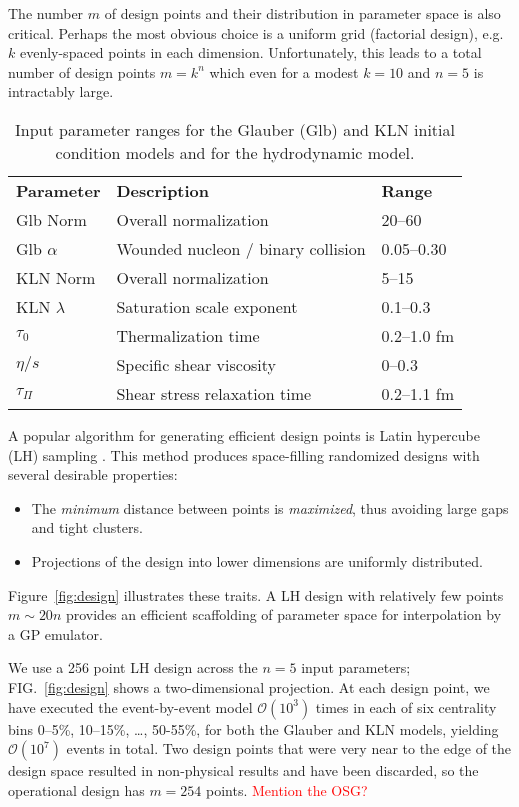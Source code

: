\documentclass[aps,prc,reprint,superscriptaddress,amsmath]{revtex4-1}
\newcommand{\todo}[1]{\textcolor{red}{#1}}
\begin{document}
The number $m$ of design points and their distribution in parameter space is also critical.
Perhaps the most obvious choice is a uniform grid (factorial design), e.g.\ $k$ evenly-spaced points in each dimension.
Unfortunately, this leads to a total number of design points $m = k^n$ which even for a modest $k = 10$ and $n = 5$ is intractably large.

\begin{table}[b]
  \caption{
    \label{tab:design}
    Input parameter ranges for the Glauber (Glb) and KLN initial condition models and for the hydrodynamic model.
  }
  \begin{ruledtabular}
  \begin{tabular}{lll}
    \bf Parameter & \bf Description & \bf Range \\
    Glb Norm & Overall normalization & 20--60 \\
    Glb $\alpha$ & Wounded nucleon / binary collision & 0.05--0.30 \\
    KLN Norm & Overall normalization & 5--15 \\
    KLN $\lambda$ & Saturation scale exponent & 0.1--0.3 \\
    $\tau_0$ & Thermalization time & 0.2--1.0 fm \\
    $\eta/s$ & Specific shear viscosity & 0--0.3 \\
    $\tau_\Pi$ & Shear stress relaxation time & 0.2--1.1 fm \\
  \end{tabular}
  \end{ruledtabular}
\end{table}

A popular algorithm for generating efficient design points is Latin hypercube (LH) sampling \cite{Tang:1993lh}.
This method produces space-filling randomized designs with several desirable properties:
\begin{itemize}
  \item The \emph{minimum} distance between points is \emph{maximized}, thus avoiding large gaps and tight clusters.
  \item Projections of the design into lower dimensions are uniformly distributed.
\end{itemize}
Figure~\ref{fig:design} illustrates these traits.
A LH design with relatively few points $m \sim 20n$ provides an efficient scaffolding of parameter space for interpolation by a GP emulator.

We use a 256 point LH design across the $n = 5$ input parameters; FIG.~\ref{fig:design} shows a two-dimensional projection.
At each design point, we have executed the event-by-event model $\mathcal O(10^3)$ times in each of six centrality bins 0--5\%, 10--15\%, \ldots, 50-55\%, for both the Glauber and KLN models, yielding $\mathcal O(10^7)$ events in total.
Two design points that were very near to the edge of the design space resulted in non-physical results and have been discarded, so the operational design has $m = 254$ points.
\todo{Mention the OSG?}
\end{document}
